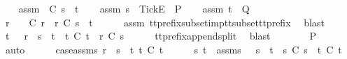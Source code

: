 \begin{isabellebody}
\ \ \isamarkupfalse%
\ assm{}{\isacharcolon}\ {\isachardoublequoteopen}{\isasymrho}\ {\isasymlesssim}\isactrlsub C\ s\ {\isacharat}\ t{\isachardoublequoteclose}\isanewline
\ \ \isamarkupfalse%
\ assm{}{\isacharcolon}\ {\isachardoublequoteopen}s\ {\isacharat}\ {\isacharbrackleft}{\isacharbrackleft}Tick{\isacharbrackright}\isactrlsub E{\isacharbrackright}\ {\isasymin}\ P{\isachardoublequoteclose}\isanewline
\ \ \isamarkupfalse%
\ assm{}{\isacharcolon}\ {\isachardoublequoteopen}t\ {\isasymin}\ Q{\isachardoublequoteclose}\isanewline
\ \ \isamarkupfalse%
\ r\ \ {}{\isacharcolon}\ {\isachardoublequoteopen}{\isasymrho}\ {\isasymsubseteq}\isactrlsub C\ r\ {\isasymand}\ r\ {\isasymle}\isactrlsub C\ s\ {\isacharat}\ t{\isachardoublequoteclose}\isanewline
\ \ \ \ \isamarkupfalse%
\ assm{}\ tt{\isacharunderscore}prefix{\isacharunderscore}subset{\isacharunderscore}imp{\isacharunderscore}tt{\isacharunderscore}subset{\isacharunderscore}tt{\isacharunderscore}prefix\ \isamarkupfalse%
\ blast\isanewline
\ \ \isamarkupfalse%
\ \isamarkupfalse%
\ t{\isacharprime}\ \ {}{\isacharcolon}\ {\isachardoublequoteopen}{\isacharparenleft}r\ {\isacharequal}\ s\ {\isacharat}\ t{\isacharprime}\ {\isasymand}\ t{\isacharprime}\ {\isasymle}\isactrlsub C\ t{\isacharparenright}\ {\isasymor}\ r\ {\isasymle}\isactrlsub C\ s{\isachardoublequoteclose}\isanewline
\ \ \ \ \isamarkupfalse%
\ tt{\isacharunderscore}prefix{\isacharunderscore}append{\isacharunderscore}split\ \isamarkupfalse%
\ blast\isanewline
\ \ \isamarkupfalse%
\ \isamarkupfalse%
\ {\isachardoublequoteopen}{\isasymrho}\ {\isasymin}\ P{\isachardoublequoteclose}\isanewline
\ \ \isamarkupfalse%
\ auto\isanewline
\ \ \ \ \isamarkupfalse%
\ case{\isacharunderscore}assms{\isacharcolon}\ {\isachardoublequoteopen}r\ {\isacharequal}\ s\ {\isacharat}\ t{\isacharprime}{\isachardoublequoteclose}\ {\isachardoublequoteopen}t{\isacharprime}\ {\isasymle}\isactrlsub C\ t{\isachardoublequoteclose}\isanewline
\ \ \ \ \isamarkupfalse%
\ s{\isacharprime}\ t{\isacharprime}{\isacharprime}\ \ {\isasymrho}{\isacharunderscore}assms{\isacharcolon}\ {\isachardoublequoteopen}{\isasymrho}\ {\isacharequal}\ s{\isacharprime}\ {\isacharat}\ t{\isacharprime}{\isacharprime}\ {\isasymand}\ s{\isacharprime}\ {\isasymsubseteq}\isactrlsub C\ s\ {\isasymand}\ t{\isacharprime}{\isacharprime}\ {\isasymsubseteq}\isactrlsub C\ t{\isacharprime}{\isachardoublequoteclose}\isanewline

\end{isabellebody}

